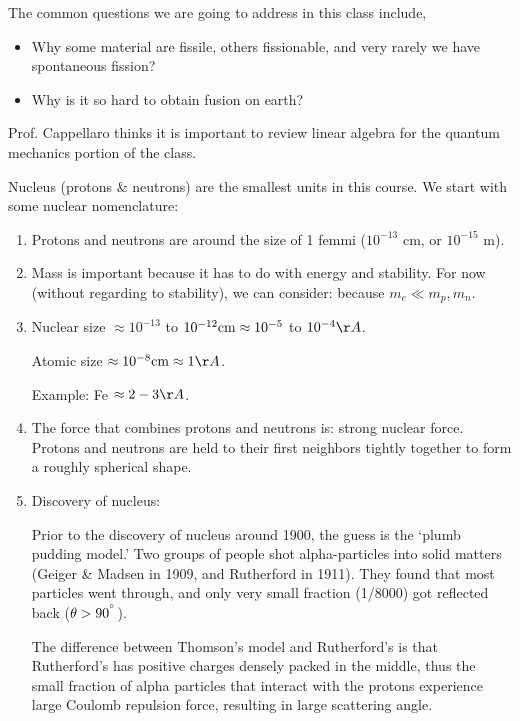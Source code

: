 \documentclass{school-22.101-notes}
\begin{document}
The common questions we are going to address in this class include,
\begin{itemize}
\item Why some material are fissile, others fissionable, and very rarely we have spontaneous fission?
\item Why is it so hard to obtain fusion on earth?
\end{itemize}

Prof. Cappellaro thinks it is important to review linear algebra for the quantum mechanics portion of the class. 


Nucleus (protons \& neutrons) are the smallest units in this course. We start with some nuclear nomenclature:
\begin{enumerate}
\item Protons and neutrons are around the size of 1 femmi ($10^{-13}$ cm, or $10^{-15}$ m). 

\item Mass is important because it has to do with energy and stability. For now (without regarding to stability), we can consider: 
because $m_e \ll m_p, m_n$. 

\item Nuclear size $\approx 10^{-13}$ to $10^{-12} \mathrm{cm} \approx 10^{-5}$ to $10^{-4} \AA$. 

Atomic size $\approx 10^{-8} \cm \approx 1 \AA$. 

Example: Fe $\approx 2-3 \AA$. 

\item The force that combines protons and neutrons is: strong nuclear force. Protons and neutrons are held to their first neighbors tightly together to form a roughly spherical shape. 

\item Discovery of nucleus: 

Prior to the discovery of nucleus around 1900, the guess is the `plumb pudding model.' Two groups of people shot alpha-particles into solid matters (Geiger \& Madsen in 1909, and Rutherford in 1911). They found that most particles went through, and only very small fraction (1/8000) got reflected back ($\theta > 90^{^{\circ}}$). 

The difference between Thomson's model and Rutherford's is that Rutherford's has positive charges densely packed in the middle, thus the small fraction of alpha particles that interact with the protons experience large Coulomb repulsion force, resulting in large scattering angle. 


\end{enumerate}
\end{document}
